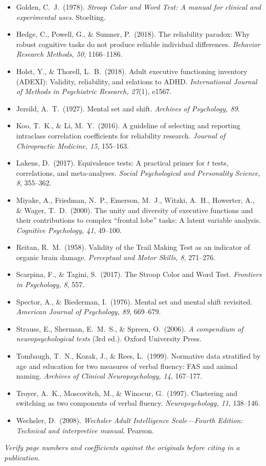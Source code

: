 \documentclass[11pt,a4paper]{article}
\begin{document}
\begin{small}
\begin{itemize}[leftmargin=1.2em,itemsep=2pt]
\item Golden, C.\ J.\ (1978). \emph{Stroop Color and Word Test: A manual for clinical and experimental uses}. Stoelting.
\item Hedge, C., Powell, G., \& Sumner, P.\ (2018). The reliability paradox: Why robust cognitive tasks do not produce reliable individual differences. \emph{Behavior Research Methods, 50}, 1166--1186.
\item Holst, Y., \& Thorell, L.\ B.\ (2018). Adult executive functioning inventory (ADEXI): Validity, reliability, and relations to ADHD. \emph{International Journal of Methods in Psychiatric Research, 27}(1), e1567.
\item Jersild, A.\ T.\ (1927). Mental set and shift. \emph{Archives of Psychology, 89}.
\item Koo, T.\ K., \& Li, M.\ Y.\ (2016). A guideline of selecting and reporting intraclass correlation coefficients for reliability research. \emph{Journal of Chiropractic Medicine, 15}, 155--163.
\item Lakens, D.\ (2017). Equivalence tests: A practical primer for $t$ tests, correlations, and meta-analyses. \emph{Social Psychological and Personality Science, 8}, 355--362.
\item Miyake, A., Friedman, N.\ P., Emerson, M.\ J., Witzki, A.\ H., Howerter, A., \& Wager, T.\ D.\ (2000). The unity and diversity of executive functions and their contributions to complex ``frontal lobe'' tasks: A latent variable analysis. \emph{Cognitive Psychology, 41}, 49--100.
\item Reitan, R.\ M.\ (1958). Validity of the Trail Making Test as an indicator of organic brain damage. \emph{Perceptual and Motor Skills, 8}, 271--276.
\item Scarpina, F., \& Tagini, S.\ (2017). The Stroop Color and Word Test. \emph{Frontiers in Psychology, 8}, 557.
\item Spector, A., \& Biederman, I.\ (1976). Mental set and mental shift revisited. \emph{American Journal of Psychology, 89}, 669--679.
\item Strauss, E., Sherman, E.\ M.\ S., \& Spreen, O.\ (2006). \emph{A compendium of neuropsychological tests} (3rd ed.). Oxford University Press.
\item Tombaugh, T.\ N., Kozak, J., \& Rees, L.\ (1999). Normative data stratified by age and education for two measures of verbal fluency: FAS and animal naming. \emph{Archives of Clinical Neuropsychology, 14}, 167--177.
\item Troyer, A.\ K., Moscovitch, M., \& Winocur, G.\ (1997). Clustering and switching as two components of verbal fluency. \emph{Neuropsychology, 11}, 138--146.
\item Wechsler, D.\ (2008). \emph{Wechsler Adult Intelligence Scale---Fourth Edition: Technical and interpretive manual}. Pearson.
\end{itemize}
\emph{Verify page numbers and coefficients against the originals before citing in a publication.}
\end{small}
\end{document}

